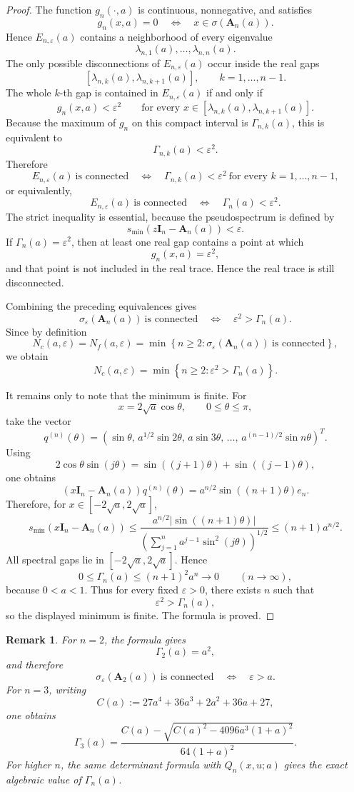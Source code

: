 \documentclass[11pt]{article}
\newtheorem{remark}[theorem]{Remark}
\newcommand{\A}{\mathbf A}
\newcommand{\I}{\mathbf I}
\newcommand{\eps}{\varepsilon}
\begin{document}
\begin{proof}
The function \(g_n(\cdot,a)\) is continuous, nonnegative, and satisfies
\[
g_n(x,a)=0
\quad\Longleftrightarrow\quad
x\in\sigma(\A_n(a)).
\]
Hence \(E_{n,\eps}(a)\) contains a neighborhood of every eigenvalue
\[
\lambda_{n,1}(a),\dots,\lambda_{n,n}(a).
\]
The only possible disconnections of \(E_{n,\eps}(a)\) occur inside the real gaps
\[
[\lambda_{n,k}(a),\lambda_{n,k+1}(a)],
\qquad k=1,\dots,n-1.
\]
The whole \(k\)-th gap is contained in \(E_{n,\eps}(a)\) if and only if
\[
g_n(x,a)<\eps^2
\qquad
\text{for every }
x\in[\lambda_{n,k}(a),\lambda_{n,k+1}(a)].
\]
Because the maximum of \(g_n\) on this compact interval is \(\Gamma_{n,k}(a)\), this is equivalent to
\[
\Gamma_{n,k}(a)<\eps^2.
\]
Therefore
\[
E_{n,\eps}(a)\ \text{is connected}
\quad\Longleftrightarrow\quad
\Gamma_{n,k}(a)<\eps^2
\ \text{for every }k=1,\dots,n-1,
\]
or equivalently,
\[
E_{n,\eps}(a)\ \text{is connected}
\quad\Longleftrightarrow\quad
\Gamma_n(a)<\eps^2.
\]
The strict inequality is essential, because the pseudospectrum is defined by
\[
s_{\min}(z\I_n-\A_n(a))<\eps.
\]
If \(\Gamma_n(a)=\eps^2\), then at least one real gap contains a point at which
\[
g_n(x,a)=\eps^2,
\]
and that point is not included in the real trace. Hence the real trace is still disconnected.

Combining the preceding equivalences gives
\[
\sigma_\eps(\A_n(a))\ \text{is connected}
\quad\Longleftrightarrow\quad
\eps^2>\Gamma_n(a).
\]
Since by definition
\[
N_c(a,\eps)=N_f(a,\eps)
=
\min\left\{
n\ge2:
\sigma_\eps(\A_n(a))\ \text{is connected}
\right\},
\]
we obtain
\[
N_c(a,\eps)
=
\min\left\{
n\ge2:\eps^2>\Gamma_n(a)
\right\}.
\]

It remains only to note that the minimum is finite. For
\[
x=2\sqrt a\cos\theta,\qquad 0\le\theta\le\pi,
\]
take the vector
\[
q^{(n)}(\theta)
=
\left(
\sin\theta,\,
a^{1/2}\sin2\theta,\,
a\sin3\theta,\,
\dots,\,
a^{(n-1)/2}\sin n\theta
\right)^T.
\]
Using
\[
2\cos\theta\sin(j\theta)
=
\sin((j+1)\theta)+\sin((j-1)\theta),
\]
one obtains
\[
(x\I_n-\A_n(a))q^{(n)}(\theta)
=
a^{n/2}\sin((n+1)\theta)e_n.
\]
Therefore, for \(x\in[-2\sqrt a,2\sqrt a]\),
\[
s_{\min}(x\I_n-\A_n(a))
\le
\frac{
a^{n/2}|\sin((n+1)\theta)|
}{
\left(\sum_{j=1}^n a^{j-1}\sin^2(j\theta)\right)^{1/2}
}
\le
(n+1)a^{n/2}.
\]
All spectral gaps lie in \([-2\sqrt a,2\sqrt a]\). Hence
\[
0\le\Gamma_n(a)\le (n+1)^2a^n\longrightarrow0
\qquad(n\to\infty),
\]
because \(0<a<1\). Thus for every fixed \(\eps>0\), there exists \(n\) such that
\[
\eps^2>\Gamma_n(a),
\]
so the displayed minimum is finite. The formula is proved.
\end{proof}

\begin{remark}
For \(n=2\), the formula gives
\[
\Gamma_2(a)=a^2,
\]
and therefore
\[
\sigma_\eps(\A_2(a))\ \text{is connected}
\quad\Longleftrightarrow\quad
\eps>a.
\]
For \(n=3\), writing
\[
C(a):=27a^4+36a^3+2a^2+36a+27,
\]
one obtains
\[
\Gamma_3(a)
=
\frac{
C(a)-\sqrt{C(a)^2-4096a^3(1+a)^2}
}{
64(1+a)^2
}.
\]
For higher \(n\), the same determinant formula with \(Q_n(x,u;a)\) gives the exact algebraic value of \(\Gamma_n(a)\).
\end{remark}
\end{document}
